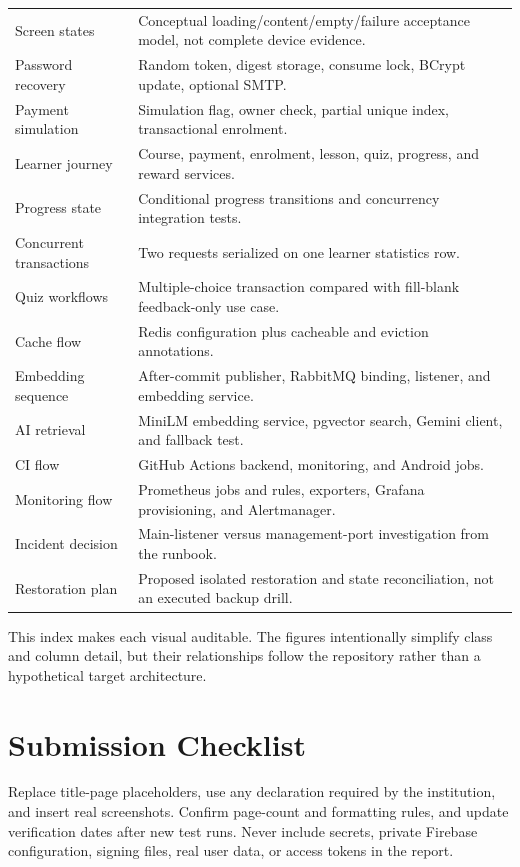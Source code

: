 \documentclass[12pt,a4paper,oneside]{report}
\begin{document}
\begin{longtable}{P{0.31\textwidth}P{0.57\textwidth}}
Screen states & Conceptual loading/content/empty/failure acceptance model, not complete device evidence.\\
Password recovery & Random token, digest storage, consume lock, BCrypt update, optional SMTP.\\
Payment simulation & Simulation flag, owner check, partial unique index, transactional enrolment.\\
Learner journey & Course, payment, enrolment, lesson, quiz, progress, and reward services.\\
Progress state & Conditional progress transitions and concurrency integration tests.\\
Concurrent transactions & Two requests serialized on one learner statistics row.\\
Quiz workflows & Multiple-choice transaction compared with fill-blank feedback-only use case.\\
Cache flow & Redis configuration plus cacheable and eviction annotations.\\
Embedding sequence & After-commit publisher, RabbitMQ binding, listener, and embedding service.\\
AI retrieval & MiniLM embedding service, pgvector search, Gemini client, and fallback test.\\
CI flow & GitHub Actions backend, monitoring, and Android jobs.\\
Monitoring flow & Prometheus jobs and rules, exporters, Grafana provisioning, and Alertmanager.\\
Incident decision & Main-listener versus management-port investigation from the runbook.\\
Restoration plan & Proposed isolated restoration and state reconciliation, not an executed backup drill.\\
\bottomrule
\end{longtable}

This index makes each visual auditable. The figures intentionally simplify class and
column detail, but their relationships follow the repository rather than a hypothetical
target architecture.

\chapter{Submission Checklist}
Replace title-page placeholders, use any declaration required by the institution,
and insert real screenshots. Confirm page-count and formatting rules, and update
verification dates after new test runs. Never include secrets, private Firebase
configuration, signing files, real user data, or access tokens in the report.


\begingroup
\raggedright

\endgroup
\end{document}

